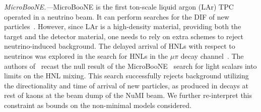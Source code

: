 \documentclass[
reprint,
superscriptaddress,
showpacs,
preprintnumbers,
bibnotes,
amsmath,
amssymb,
aps,
prd,
floatfix
]{revtex4-2}
\begin{document}
\emph{MicroBooNE.---}MicroBooNE is the first ton-scale liquid argon (LAr) TPC operated in a neutrino beam.
It can perform searches for the DIF of new particles~\cite{Batell:2009di,Ballett:2016opr,Batell:2019nwo}.
However, since LAr is a high-density material, providing both the target and the detector material, one needs to rely on extra schemes to reject neutrino-induced background.
The delayed arrival of HNLs with respect to neutrinos 
was explored in the search for HNLs in the $\mu\pi$ decay channel~\cite{microboone_hnl}.
The authors of~\cite{Kelly:2021xbv} recast the null result of the MicroBooNE~\cite{MicroBooNE:2021ewq} search for light scalars into limits on the HNL mixing. 
This search successfully rejects background utilizing the directionality and time of arrival of new particles, as produced in decays at rest of kaons at the beam dump of the NuMI beam.
We further re-interpret this constraint as bounds on the non-minimal models considered.
\end{document}
